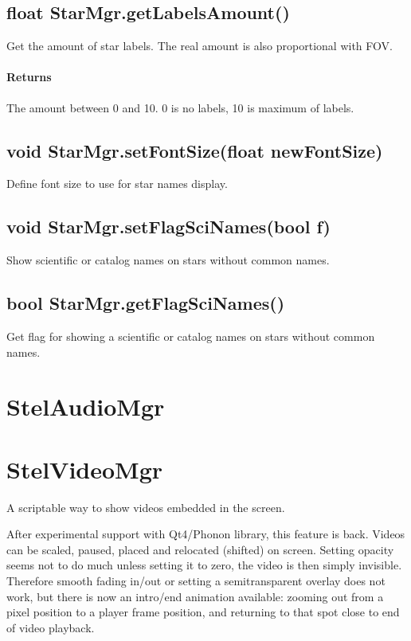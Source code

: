 \subsection{float StarMgr.getLabelsAmount()}
\label{sec:ScriptingAPI:StarMgr:getLabelsAmount}
Get the amount of star labels. The real amount is also proportional with FOV.

\paragraph{Returns}
The amount between 0 and 10. 0 is no labels, 10 is maximum of labels.

\subsection{void StarMgr.setFontSize(float newFontSize)}
\label{sec:ScriptingAPI:StarMgr:setFontSize}
Define font size to use for star names display.

\subsection{void StarMgr.setFlagSciNames(bool f)}
\label{sec:ScriptingAPI:StarMgr:setFlagSciNames}
Show scientific or catalog names on stars without common names.

\subsection{bool StarMgr.getFlagSciNames()}
\label{sec:ScriptingAPI:StarMgr:getFlagSciNames}
Get flag for showing a scientific or catalog names on stars without common names.

\section{StelAudioMgr}
\label{sec:ScriptingAPI:StelAudioMgr}

\section{StelVideoMgr}
\label{sec:ScriptingAPI:StelVideoMgr}

A scriptable way to show videos embedded in the screen.

After experimental support with Qt4/Phonon library, this feature is back. Videos can be scaled, paused, placed and relocated (shifted) on screen. Setting opacity seems not to do much unless setting it to zero, the video is then simply invisible. Therefore smooth fading in/out or setting a semitransparent overlay does not work, but there is now an intro/end animation available: zooming out from a pixel position to a player frame position, and returning to that spot close to end of video playback.

